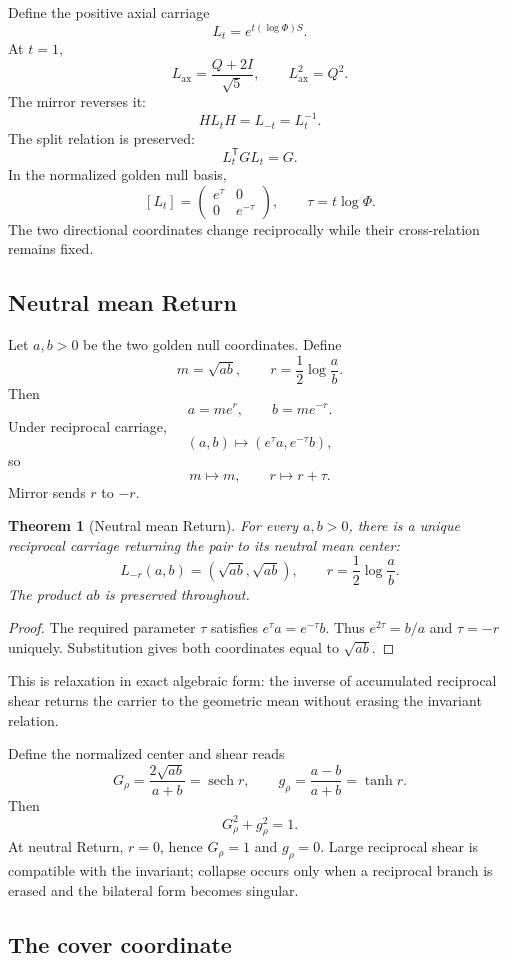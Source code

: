 \documentclass[11pt]{article}
\newtheorem{theorem}{Theorem}[section]
\newcommand{\sech}{\operatorname{sech}}
\begin{document}
Define the positive axial carriage
\[
L_t=e^{t(\log\Phi)S}.
\]
At $t=1$,
\[
L_{\mathrm{ax}}=\frac{Q+2I}{\sqrt5},
\qquad
L_{\mathrm{ax}}^2=Q^2.
\]
The mirror reverses it:
\[
\boxed{HL_tH=L_{-t}=L_t^{-1}.}
\]
The split relation is preserved:
\[
\boxed{L_t^{\mathsf T}GL_t=G.}
\]
In the normalized golden null basis,
\[
[L_t]=
\begin{pmatrix}
e^\tau&0\\0&e^{-\tau}
\end{pmatrix},
\qquad
\tau=t\log\Phi.
\]
The two directional coordinates change reciprocally while their cross-relation remains fixed.

\subsection{Neutral mean Return}

Let $a,b>0$ be the two golden null coordinates. Define
\[
m=\sqrt{ab},
\qquad
r=\frac12\log\frac{a}{b}.
\]
Then
\[
a=me^r,
\qquad
b=me^{-r}.
\]
Under reciprocal carriage,
\[
(a,b)\mapsto(e^\tau a,e^{-\tau}b),
\]
so
\[
m\mapsto m,
\qquad
r\mapsto r+\tau.
\]
Mirror sends $r$ to $-r$.

\begin{theorem}[Neutral mean Return]
For every $a,b>0$, there is a unique reciprocal carriage returning the pair to its neutral mean center:
\[
\boxed{
L_{-r}(a,b)=\left(\sqrt{ab},\sqrt{ab}\right),
\qquad
r=\frac12\log\frac ab.
}
\]
The product $ab$ is preserved throughout.
\end{theorem}
\begin{proof}
The required parameter $\tau$ satisfies $e^\tau a=e^{-\tau}b$. Thus $e^{2\tau}=b/a$ and $\tau=-r$ uniquely. Substitution gives both coordinates equal to $\sqrt{ab}$.
\end{proof}

This is relaxation in exact algebraic form: the inverse of accumulated reciprocal shear returns the carrier to the geometric mean without erasing the invariant relation.

Define the normalized center and shear reads
\[
G_\rho=\frac{2\sqrt{ab}}{a+b}=\sech r,
\qquad
g_\rho=\frac{a-b}{a+b}=\tanh r.
\]
Then
\[
\boxed{G_\rho^2+g_\rho^2=1.}
\]
At neutral Return, $r=0$, hence $G_\rho=1$ and $g_\rho=0$. Large reciprocal shear is compatible with the invariant; collapse occurs only when a reciprocal branch is erased and the bilateral form becomes singular.

\subsection{The cover coordinate}
\end{document}
